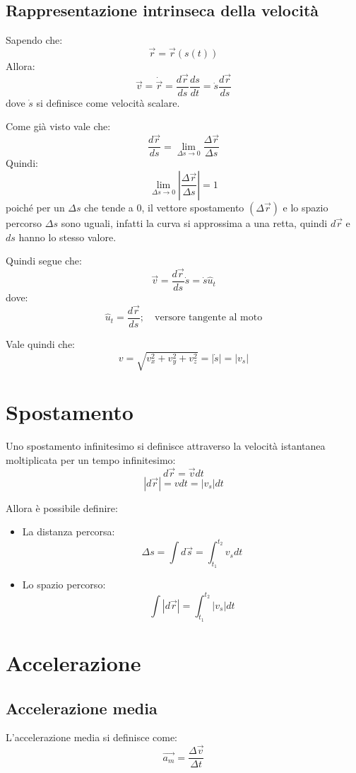 \documentclass[11pt, a4paper, openright]{book}
\theoremstyle{plain}
\theoremstyle{definition}
\begin{document}
\newpage
\subsection{Rappresentazione intrinseca della velocità}
Sapendo che:
\[\vec{r} = \vec{r}(s(t))\]
Allora:
\[\vec{v} = \dot{\vec{r}} = \frac{d\vec{r}}{ds}\frac{ds}{dt} = \dot{s}\frac{d\vec{r}}{ds}\]
dove $\dot{s}$ si definisce come velocità scalare.

Come già visto vale che:
\[\frac{d\vec{r}}{ds} = \lim_{\Delta s \rightarrow 0} \frac{\Delta \vec{r}}{\Delta s}\]
Quindi:
\[\lim_{\Delta s \rightarrow 0} \left|\frac{\Delta\vec{r}}{\Delta s}\right| = 1\]
poiché per un $\Delta s$ che tende a 0, il vettore spostamento $(\Delta \vec{r})$ e lo spazio percorso $\Delta s$ sono uguali, infatti la curva si approssima a una retta, quindi $d\vec{r}$ e $ds$ hanno lo stesso valore.

Quindi segue che:
\[\vec{v} = \frac{d\vec{r}}{ds}\dot{s} = \dot{s}\hat{u}_t\]
dove:
\[\hat{u}_t = \frac{d\vec{r}}{ds}; \quad \text{versore tangente al moto}\]

Vale quindi che:
\[v = \sqrt{v_x^2 + v_y^2+v_z^2} = |\dot{s}| = |v_s|\]

\section{Spostamento}
Uno spostamento infinitesimo si definisce attraverso la velocità istantanea moltiplicata per un tempo infinitesimo:
\[d\vec{r} = \vec{v}dt\]
\[|d\vec{r}| = vdt = |v_s|dt\]

Allora è possibile definire:
\begin{itemize}
    \item La distanza percorsa:
        \[\Delta s = \int d\vec{s} = \int_{t_1}^{t_2}v_sdt\]
        
    \item Lo spazio percorso:
        \[\int|d\vec{r}| = \int_{t_1}^{t_2}|v_s|dt\]

\end{itemize}
\newpage

\section{Accelerazione}
\subsection{Accelerazione media}
L'accelerazione media si definisce come:
\[\vec{a_m} = \frac{\Delta\vec{v}}{\Delta t}\]
\end{document}

